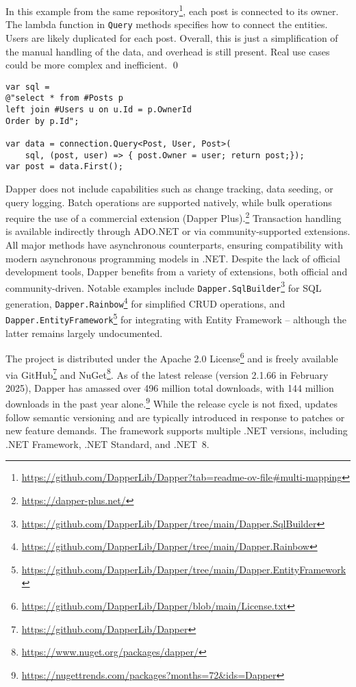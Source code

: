 \begin{example}
\small
In this example from the same repository\footnote{\url{https://github.com/DapperLib/Dapper?tab=readme-ov-file\#multi-mapping}}, each post is connected to its owner. The lambda function in \texttt{Query} methods specifies how to connect the entities. Users are likely duplicated for each post. Overall, this is just a simplification of the manual handling of the data, and overhead is still present. Real use cases could be more complex and inefficient.
\qed

\begin{lstlisting}[language=CSharp]
var sql =
@"select * from #Posts p
left join #Users u on u.Id = p.OwnerId
Order by p.Id";

var data = connection.Query<Post, User, Post>(
    sql, (post, user) => { post.Owner = user; return post;});
var post = data.First();
\end{lstlisting}
\end{example}

Dapper does not include capabilities such as change tracking, data seeding, or query logging. Batch operations are supported natively, while bulk operations require the use of a commercial extension (Dapper Plus).\footnote{\url{https://dapper-plus.net/}} Transaction handling is available indirectly through ADO.NET or via community-supported extensions. All major methods have asynchronous counterparts, ensuring compatibility with modern asynchronous programming models in .NET. Despite the lack of official development tools, Dapper benefits from a variety of extensions, both official and community-driven. Notable examples include \texttt{Dapper.SqlBuilder}\footnote{\url{https://github.com/DapperLib/Dapper/tree/main/Dapper.SqlBuilder}} for SQL generation, \texttt{Dapper.Rainbow}\footnote{\url{https://github.com/DapperLib/Dapper/tree/main/Dapper.Rainbow}} for simplified CRUD operations, and \texttt{Dapper.EntityFramework}\footnote{\url{https://github.com/DapperLib/Dapper/tree/main/Dapper.EntityFramework}} for integrating with Entity Framework -- although the latter remains largely undocumented.

The project is distributed under the Apache 2.0 License\footnote{\url{https://github.com/DapperLib/Dapper/blob/main/License.txt}} and is freely available via GitHub\footnote{\url{https://github.com/DapperLib/Dapper}} and NuGet\footnote{\url{https://www.nuget.org/packages/dapper/}}. As of the latest release (version 2.1.66 in February 2025), Dapper has amassed over 496 million total downloads, with 144 million downloads in the past year alone.\footnote{\url{https://nugettrends.com/packages?months=72&ids=Dapper}} While the release cycle is not fixed, updates follow semantic versioning and are typically introduced in response to patches or new feature demands. The framework supports multiple .NET versions, including .NET Framework, .NET Standard, and .NET~8.

